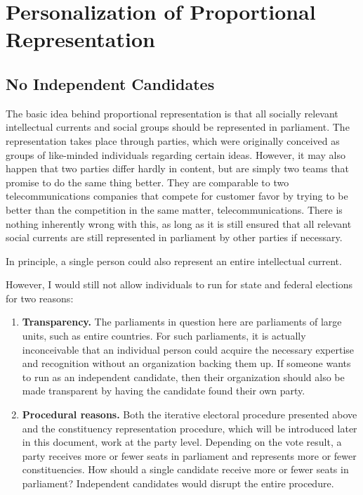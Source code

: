 \section{Personalization of Proportional Representation}

\subsection{No Independent Candidates}

The basic idea behind proportional representation is that all socially
relevant intellectual currents and social groups should be represented in parliament. The
representation takes place through parties, which were originally conceived as groups of like-minded individuals
regarding certain ideas. However, it may also happen that two parties
differ hardly in content, but are simply two teams that promise to
do the same thing better. They are comparable to two telecommunications companies that
compete for customer favor by trying to be better than the competition in the same matter, telecommunications.
There is nothing inherently wrong with this, as long as it is still
ensured that all relevant social currents are still represented in parliament by other parties if necessary.

In principle, a single person could also represent an entire intellectual current.

However, I would still not allow individuals to run for state and
federal elections for two reasons:
\begin{enumerate}
  \item \textbf{Transparency.} The parliaments in question here are parliaments of large
    units, such as entire countries. For such parliaments, it is actually inconceivable
    that an individual person could acquire the necessary expertise and recognition without an organization
    backing them up. If someone wants to run as an independent candidate, then their
    organization should also be made transparent by having the candidate found their own party.

  \item \textbf{Procedural reasons.} Both the iterative electoral procedure presented above and
    the constituency representation procedure, which will be introduced later in this document,
    work at the party level. Depending on the vote result, a party receives more or fewer
    seats in parliament and represents more or fewer constituencies. How should a single candidate
    receive more or fewer seats in parliament? Independent candidates would disrupt the entire procedure.
\end{enumerate}

